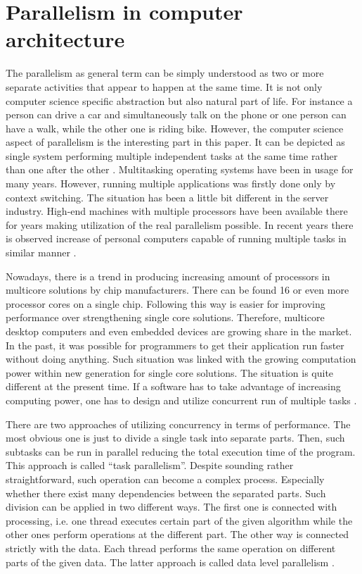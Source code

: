 \section{Parallelism in computer architecture}

The parallelism as general term can be simply understood as two or more separate activities
that appear to happen at the same time. It is not only computer science specific abstraction
but also natural part of life. For instance a person can drive a car and simultaneously
talk on the phone or one person can have a walk, while the other one is riding bike.
However, the computer science aspect of parallelism is the interesting part in this paper.
It can be depicted as single system performing multiple independent tasks at the same time
rather than one after the other \cite{cpp_concurrency}. Multitasking operating systems have been
in usage for many years. However, running multiple applications was firstly done only by context switching.
The situation has been a little bit different in the server industry. High-end machines with multiple processors
have been available there for years making utilization of the real parallelism possible.
In recent years there is observed increase of personal computers capable of running multiple tasks
in similar manner \cite{cpp_concurrency}.

Nowadays, there is a trend in producing increasing amount of processors in multicore solutions by chip manufacturers.
There can be found 16 or even more processor cores on a single chip. Following this way is easier
for improving performance over strengthening single core solutions. Therefore, multicore desktop
computers and even embedded devices are growing share in the market. In the past, it was possible
for programmers to get their application run faster without doing anything. Such situation
was linked with the growing computation power within new generation for single core solutions. 
The situation is quite different at the present time. If a software has to take advantage of
increasing computing power, one has to design and utilize concurrent run of multiple tasks \cite{cpp_concurrency}.

There are two approaches of utilizing concurrency in terms of performance. The most obvious one
is just to divide a single task into separate parts. Then, such subtasks can be run in parallel
reducing the total execution time of the program. This approach is called ``task parallelism''.
Despite sounding rather straightforward, such operation can become a complex process.
Especially whether there exist many dependencies between the separated parts. Such division
can be applied in two different ways. The first one is connected with processing, i.e.
one thread executes certain part of the given algorithm while the other ones perform operations
at the different part. The other way is connected strictly with the data. Each thread
performs the same operation on different parts of the given data. The latter approach is called
data level parallelism \cite{cpp_concurrency}.

